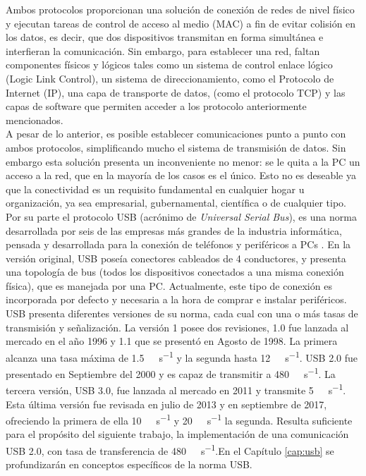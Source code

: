Ambos protocolos proporcionan una solución de conexión de redes de nivel físico y ejecutan tareas de control de acceso al medio (MAC) a fin de evitar colisión en los datos, es decir, que dos dispositivos transmitan en forma simultánea e interfieran la comunicación.
Sin embargo, para establecer una red, faltan componentes físicos y lógicos tales como un sistema de control enlace lógico (Logic Link Control), un sistema de direccionamiento, como el Protocolo de Internet (IP), una capa de transporte de datos, (como el protocolo TCP) y las capas de software que permiten acceder a los protocolo anteriormente mencionados.\\

A pesar de lo anterior, es posible establecer comunicaciones punto a punto con ambos protocolos, simplificando mucho el sistema de transmisión de datos. Sin embargo esta solución presenta un inconveniente no menor: se le quita a la PC un acceso a la red, que en la mayoría de los casos es el único. Esto no es deseable ya que la conectividad es un requisito fundamental en cualquier hogar u organización, ya sea empresarial, gubernamental, científica o de cualquier tipo.\\

Por su parte el protocolo USB (acrónimo de {\it Universal Serial Bus}), es una norma desarrollada por seis de las empresas más grandes de la industria informática, pensada y desarrollada para la conexión de teléfonos y periféricos a PCs \cite{USBspec}. En la versión original, USB poseía conectores cableados de 4 conductores, y presenta una topología de bus (todos los dispositivos conectados a una misma conexión física), que es manejada por una PC. Actualmente, este tipo de conexión es incorporada por defecto y necesaria a la hora de comprar e instalar periféricos.\\

USB presenta diferentes versiones de su norma, cada cual con una o más tasas de transmisión y señalización. La versión 1 posee dos revisiones, 1.0 fue lanzada al mercado en el año 1996 y 1.1 que se presentó en Agosto de 1998. La primera alcanza una tasa máxima de \SI{1.5}{\mega\bit\per\second} y la segunda hasta \SI{12}{\mega\bit\per\second}. USB 2.0 fue presentado en Septiembre del 2000 y es capaz de transmitir a \SI{480}{\mega\bit\per\second}. La tercera versión, USB 3.0, fue lanzada al mercado en 2011 y transmite \SI{5}{\giga\bit\per\second}. Esta última versión fue revisada en julio de 2013 y en septiembre de 2017, ofreciendo la primera de ella \SI{10}{\giga\bit\per\second} y \SI{20}{\giga\bit\per\second} la segunda. Resulta suficiente para el propósito del siguiente trabajo, la implementación de una comunicación USB 2.0, con tasa de transferencia de \SI{480}{\mega\bit\per\second}.En el Capítulo \ref{cap:usb} se profundizarán en conceptos específicos de la norma USB.\\

